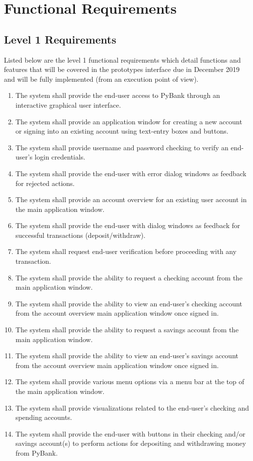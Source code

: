 \section{Functional Requirements}
\label{sect:functional_requirements}

\subsection{Level 1 Requirements}
\label{sect:level_1_requirements}

Listed below are the level 1 functional requirements which detail functions and features that will be covered in the prototypes interface due in December 2019 and will be fully implemented (from an execution point of view).

\begin{enumerate}[itemsep=1mm, parsep=0pt]
    \item {The system shall provide the end-user access to PyBank through an interactive graphical user interface.}
    \item {The system shall provide an application window for creating a new account or signing into an existing account using text-entry boxes and buttons.}
    \item {The system shall provide username and password checking to verify an end-user's login credentials.}
    \item {The system shall provide the end-user with error dialog windows as feedback for rejected actions.}
    \item {The system shall provide an account overview for an existing user account in the main application window.}
    \item {The system shall provide the end-user with dialog windows as feedback for successful transactions (deposit/withdraw).}
    \item {The system shall request end-user verification before proceeding with any transaction.}
    \item {The system shall provide the ability to request a checking account from the main application window.}
    \item {The system shall provide the ability to view an end-user's checking account from the account overview main application window once signed in.}
    \item {The system shall provide the ability to request a savings account from the main application window.}
    \item {The system shall provide the ability to view an end-user's savings account from the account overview main application window once signed in.}
    \item {The system shall provide various menu options via a menu bar at the top of the main application window.}
    \item {The system shall provide visualizations related to the end-user's checking and spending accounts.}
    \item {The system shall provide the end-user with buttons in their checking and/or savings account(s) to perform actions for depositing and withdrawing money from PyBank.}
\end{enumerate}

